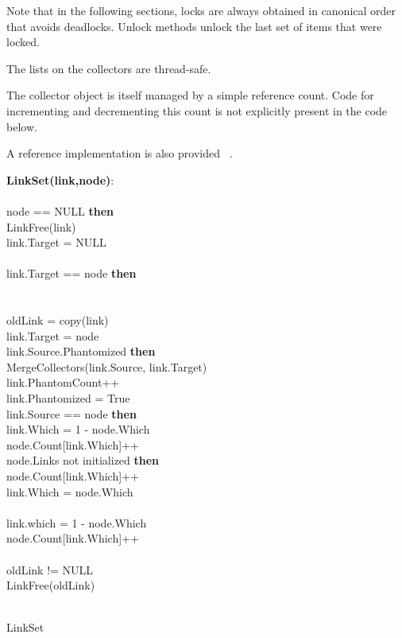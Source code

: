 Note that in the following sections, locks are always obtained in canonical order that avoids deadlocks. Unlock methods unlock the last set of items that were locked.

The lists on the collectors are thread-safe.

The collector object is itself managed by a simple reference count. Code for incrementing and decrementing this count is not explicitly present in the code below.

A reference implementation is also provided ~\cite{url:refimpl}.

\begin{algorithm}[ht]
{\small
{}
{\bf LinkSet(link,node)}:\\
\\
 node == NULL {\bf then}\\
\quad \quad LinkFree(link)\\
\quad \quad link.Target = NULL\\
\\
 link.Target == node {\bf then}\\
\quad {}\\
\\
\quad oldLink = copy(link) \\
\quad link.Target = node\\
 link.Source.Phantomized {\bf then}\\
\quad \quad MergeCollectors(link.Source, link.Target)\\
\quad \quad link.PhantomCount++\\
\quad \quad link.Phantomized = True\\
 link.Source == node {\bf then}\\
\quad \quad link.Which = 1 - node.Which\\
\quad \quad node.Count[link.Which]++\\
 node.Links not initialized {\bf then}\\
\quad \quad node.Count[link.Which]++\\
\quad \quad link.Which = node.Which\\
\\
\quad \quad link.which = 1 - node.Which\\
\quad \quad node.Count[link.Which]++\\
\\
 oldLink != NULL\\
\quad \quad LinkFree(oldLink)\\
\\
}
\caption{LinkSet}
\label{single:algorithm:linkset}
\end{algorithm}
